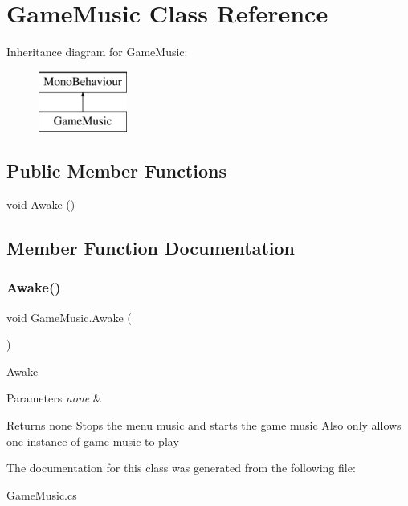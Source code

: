 \hypertarget{class_game_music}{}\section{Game\+Music Class Reference}
\label{class_game_music}
Inheritance diagram for Game\+Music\+:\begin{figure}[H]
\begin{center}
\leavevmode
\includegraphics[height=2.000000cm]{class_game_music}
\end{center}
\end{figure}
\subsection*{Public Member Functions}
\begin{DoxyCompactItemize}
\item 
void \mbox{\hyperlink{class_game_music_ae88b1b78f9172cf9e69974c27819eee1}{Awake}} ()
\end{DoxyCompactItemize}


\subsection{Member Function Documentation}
\mbox{\label{class_game_music_ae88b1b78f9172cf9e69974c27819eee1}} 
\subsubsection{\texorpdfstring{Awake()}{Awake()}}
{\footnotesize\ttfamily void Game\+Music.\+Awake (\begin{DoxyParamCaption}{ }\end{DoxyParamCaption})\hspace{0.3cm}{\ttfamily [inline]}}

Awake 
\begin{DoxyParams}{Parameters}
{\em none} & \\
\hline
\end{DoxyParams}
\begin{DoxyReturn}{Returns}
none Stops the menu music and starts the game music Also only allows one instance of game music to play 
\end{DoxyReturn}


The documentation for this class was generated from the following file\+:\begin{DoxyCompactItemize}
\item 
Game\+Music.\+cs\end{DoxyCompactItemize}
